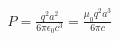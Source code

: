 

\vspace*{\fill}
\centering

\begin{align*}
   P = \frac{q^2 a^2}{6 \pi \epsilon_0 c^3} = \frac{\mu_0 q^2 a^3}{6 \pi c} \\
\end{align*}

\centering
\vspace*{\fill}

